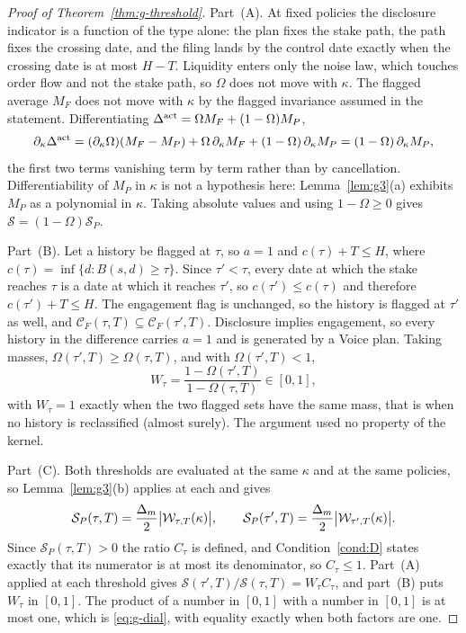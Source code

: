 \begin{proof}[Proof of Theorem~\ref{thm:g-threshold}]
Part~(A). At fixed policies the disclosure indicator is a function of the type alone: the plan
fixes the stake path, the path fixes the crossing date, and the filing lands by the control date
exactly when the crossing date is at most $H-T$. Liquidity enters only the noise law, which
touches order flow and not the stake path, so $\Omega$ does not move with $\kappa$. The flagged
average $M_F$ does not move with $\kappa$ by the flagged invariance assumed in the statement.
Differentiating $\Delta^{\mathrm{act}} = \Omega M_F + (1-\Omega)M_P$,
\[
\partial_\kappa \Delta^{\mathrm{act}}
= (\partial_\kappa \Omega)(M_F - M_P) + \Omega\,\partial_\kappa M_F
  + (1-\Omega)\,\partial_\kappa M_P
= (1-\Omega)\,\partial_\kappa M_P ,
\]
the first two terms vanishing term by term rather than by cancellation. Differentiability of
$M_P$ in $\kappa$ is not a hypothesis here: Lemma~\ref{lem:g3}(a) exhibits $M_P$ as a polynomial
in $\kappa$. Taking absolute values and using $1-\Omega \ge 0$ gives
$\mathcal S = (1-\Omega)\mathcal S_P$.

Part~(B). Let a history be flagged at $\tau$, so $a = 1$ and $c(\tau) + T \le H$, where
$c(\tau) = \inf\{d : B(s,d) \ge \tau\}$. Since $\tau' < \tau$, every date at which the stake
reaches $\tau$ is a date at which it reaches $\tau'$, so $c(\tau') \le c(\tau)$ and therefore
$c(\tau') + T \le H$. The engagement flag is unchanged, so the history is flagged at $\tau'$ as
well, and $\mathcal C_F(\tau,T)\subseteq\mathcal C_F(\tau',T)$. Disclosure implies engagement, so
every history in the difference carries $a=1$ and is generated by a Voice plan. Taking masses,
$\Omega(\tau',T)\ge\Omega(\tau,T)$, and with $\Omega(\tau',T) < 1$,
\[
W_\tau = \frac{1-\Omega(\tau',T)}{1-\Omega(\tau,T)} \in [0,1],
\]
with $W_\tau = 1$ exactly when the two flagged sets have the same mass, that is when no history
is reclassified (almost surely). The argument used no property of the kernel.

Part~(C). Both thresholds are evaluated at the same $\kappa$ and at the same policies, so
Lemma~\ref{lem:g3}(b) applies at each and gives
\[
\mathcal S_P(\tau,T) = \frac{\Delta_m}{2}\bigl|\mathcal{W}_{\tau,T}(\kappa)\bigr|,
\qquad
\mathcal S_P(\tau',T) = \frac{\Delta_m}{2}\bigl|\mathcal{W}_{\tau',T}(\kappa)\bigr| .
\]
Since $\mathcal S_P(\tau,T) > 0$ the ratio $C_\tau$ is defined, and
Condition~\ref{cond:D} states exactly that its numerator is at most its denominator, so
$C_\tau \le 1$. Part~(A) applied at each threshold gives
$\mathcal S(\tau',T)/\mathcal S(\tau,T) = W_\tau C_\tau$, and part~(B) puts $W_\tau$ in $[0,1]$.
The product of a number in $[0,1]$ with a number in $[0,1]$ is at most one, which is
\eqref{eq:g-dial}, with equality exactly when both factors are one.
\end{proof}

